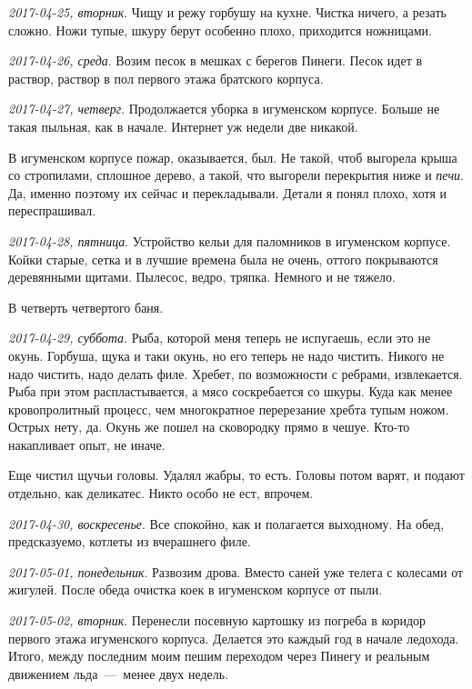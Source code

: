 \documentclass[
    12pt
    ,a4paper
    ,oneside
    ,russian
]{memoir}
\newcommand{\mydatestamp}{
    \bigskip   %
    \emph
}
\newcommand{\mds}{\mydatestamp}
\begin{document}
    \mds{2017-04-25, вторник}. Чищу и режу горбушу на кухне. Чистка ничего, а резать сложно. Ножи тупые, шкуру берут особенно плохо, приходится ножницами.
    
    \mds{2017-04-26, среда}. Возим песок в мешках с берегов Пинеги. Песок идет в раствор, раствор в пол первого этажа братского корпуса.
    
    \mds{2017-04-27, четверг}. Продолжается уборка в игуменском корпусе. Больше не такая пыльная, как в начале. Интернет уж недели две никакой.
    
    В игуменском корпусе пожар, оказывается, был. Не такой, чтоб выгорела крыша со стропилами, сплошное дерево, а такой, что выгорели перекрытия ниже и \emph{печи}. Да, именно поэтому их сейчас и перекладывали. Детали я понял плохо, хотя и переспрашивал.
    
    \mds{2017-04-28, пятница}. Устройство кельи для паломников в игуменском корпусе. Койки старые, сетка и в лучшие времена была не очень, оттого покрываются деревянными щитами. Пылесос, ведро, тряпка. Немного и не тяжело.
    
    В четверть четвертого баня.
    
    \mds{2017-04-29, суббота}. Рыба, которой меня теперь не испугаешь, если это не окунь. Горбуша, щука и таки окунь, но его теперь не надо чистить. Никого не надо чистить, надо делать филе. Хребет, по возможности с ребрами, извлекается. Рыба при этом распластывается, а мясо соскребается со шкуры. Куда как менее кровопролитный процесс, чем многократное перерезание хребта тупым ножом. Острых нету, да. Окунь же пошел на сковородку прямо в чешуе. Кто-то накапливает опыт, не иначе.
    
    Еще чистил щучьи головы. Удалял жабры, то есть. Головы потом варят, и подают отдельно, как деликатес. Никто особо не ест, впрочем.
    
    \mds{2017-04-30, воскресенье}. Все спокойно, как и полагается выходному. На обед, предсказуемо, котлеты из вчерашнего филе.
    
    \mds{2017-05-01, понедельник}. Развозим дрова. Вместо саней уже телега с колесами от жигулей. После обеда очистка коек в игуменском корпусе от пыли.
    
    \mds{2017-05-02, вторник}. Перенесли посевную картошку из погреба в коридор первого этажа игуменского корпуса. Делается это каждый год в начале ледохода. Итого, между последним моим пешим переходом через Пинегу и реальным движением льда~---~менее двух недель.
    
\end{document}
